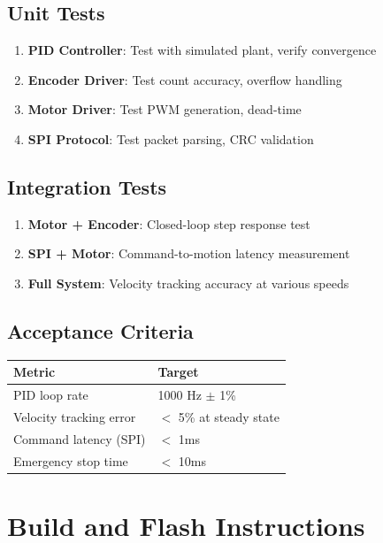 \documentclass[11pt,letterpaper]{article}
\begin{document}
\subsection{Unit Tests}

\begin{enumerate}
    \item \textbf{PID Controller}: Test with simulated plant, verify convergence
    \item \textbf{Encoder Driver}: Test count accuracy, overflow handling
    \item \textbf{Motor Driver}: Test PWM generation, dead-time
    \item \textbf{SPI Protocol}: Test packet parsing, CRC validation
\end{enumerate}

\subsection{Integration Tests}

\begin{enumerate}
    \item \textbf{Motor + Encoder}: Closed-loop step response test
    \item \textbf{SPI + Motor}: Command-to-motion latency measurement
    \item \textbf{Full System}: Velocity tracking accuracy at various speeds
\end{enumerate}

\subsection{Acceptance Criteria}

\begin{table}[H]
\centering
\begin{tabular}{|l|l|}
\hline
\textbf{Metric} & \textbf{Target} \\
\hline
PID loop rate & 1000 Hz $\pm$ 1\% \\
Velocity tracking error & $<$ 5\% at steady state \\
Command latency (SPI) & $<$ 1ms \\
Emergency stop time & $<$ 10ms \\
\hline
\end{tabular}
\end{table}

\section{Build and Flash Instructions}
\end{document}

